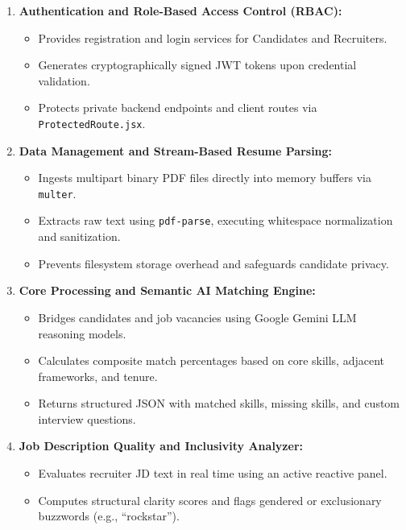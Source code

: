 \documentclass[12pt, a4paper]{article}
\begin{document}
\begin{enumerate}[label=\textbf{Module \arabic* --}, leftmargin=2em, itemsep=5pt]
    \item \textbf{Authentication and Role-Based Access Control (RBAC):}
    \begin{itemize}[leftmargin=1.2em]
        \item Provides registration and login services for Candidates and Recruiters.
        \item Generates cryptographically signed JWT tokens upon credential validation.
        \item Protects private backend endpoints and client routes via \texttt{ProtectedRoute.jsx}.
    \end{itemize}

    \item \textbf{Data Management and Stream-Based Resume Parsing:}
    \begin{itemize}[leftmargin=1.2em]
        \item Ingests multipart binary PDF files directly into memory buffers via \texttt{multer}.
        \item Extracts raw text using \texttt{pdf-parse}, executing whitespace normalization and sanitization.
        \item Prevents filesystem storage overhead and safeguards candidate privacy.
    \end{itemize}

    \item \textbf{Core Processing and Semantic AI Matching Engine:}
    \begin{itemize}[leftmargin=1.2em]
        \item Bridges candidates and job vacancies using Google Gemini LLM reasoning models.
        \item Calculates composite match percentages based on core skills, adjacent frameworks, and tenure.
        \item Returns structured JSON with matched skills, missing skills, and custom interview questions.
    \end{itemize}

    \item \textbf{Job Description Quality and Inclusivity Analyzer:}
    \begin{itemize}[leftmargin=1.2em]
        \item Evaluates recruiter JD text in real time using an active reactive panel.
        \item Computes structural clarity scores and flags gendered or exclusionary buzzwords (e.g., ``rockstar'').
    \end{itemize}


\end{enumerate}
\end{document}
